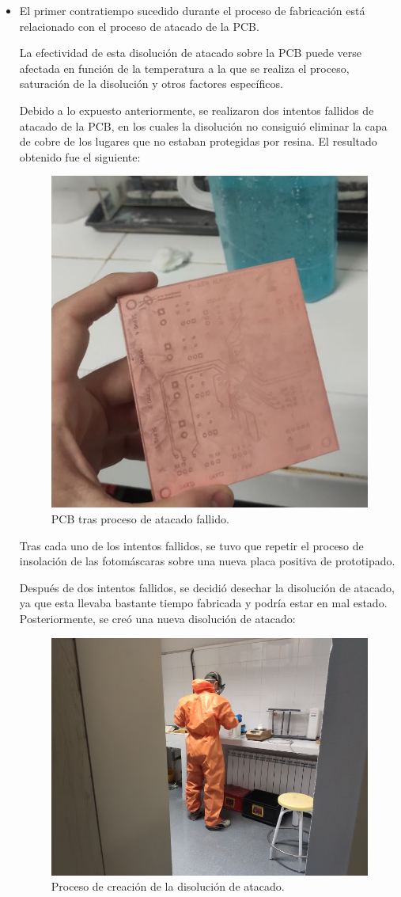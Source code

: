 \begin{itemize}
    \item El primer contratiempo sucedido durante el proceso de fabricación está relacionado con el proceso de atacado de la \ac{PCB}.
    
    La efectividad de esta disolución de atacado sobre la \ac{PCB} puede verse afectada en función de la temperatura a la que se realiza el proceso, saturación de la disolución y otros factores específicos.
    
    Debido a lo expuesto anteriormente, se realizaron dos intentos fallidos de atacado de la \ac{PCB}, en los cuales la disolución no consiguió eliminar la capa de cobre de los lugares que no estaban protegidas por resina. El resultado obtenido fue el siguiente:
    
    \begin{figure}[H]
    \centering 
    \includegraphics[width=0.55\linewidth]{pictures/FalloPCB.jpg}
    \caption{\ac{PCB} tras proceso de atacado fallido.}
    \end{figure}
    
    Tras cada uno de los intentos fallidos, se tuvo que repetir el proceso de insolación de las fotomáscaras sobre una nueva placa positiva de prototipado.
    
    Después de dos intentos fallidos, se decidió desechar la disolución de atacado, ya que esta llevaba bastante tiempo fabricada y podría estar en mal estado. Posteriormente, se creó una nueva disolución de atacado:
    
    \begin{figure}[H]
    \centering 
    \includegraphics[width=0.65\linewidth]{pictures/BreakingBad.jpg}
    \caption{Proceso de creación de la disolución de atacado.}
    \end{figure}
    

\end{itemize}
